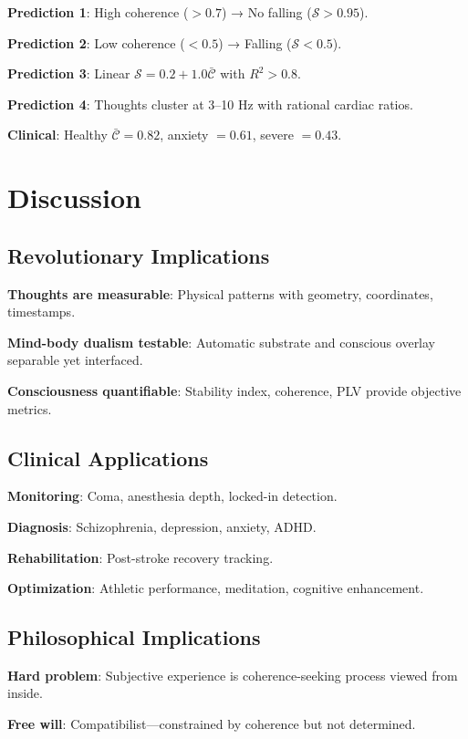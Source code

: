 \documentclass[12pt,twocolumn]{article}
\theoremstyle{remark}
\begin{document}
\textbf{Prediction 1}: High coherence ($> 0.7$) → No falling ($\mathcal{S} > 0.95$).

\textbf{Prediction 2}: Low coherence ($< 0.5$) → Falling ($\mathcal{S} < 0.5$).

\textbf{Prediction 3}: Linear $\mathcal{S} = 0.2 + 1.0 \bar{\mathcal{C}}$ with $R^2 > 0.8$.

\textbf{Prediction 4}: Thoughts cluster at 3--10 Hz with rational cardiac ratios.

\textbf{Clinical}: Healthy $\bar{\mathcal{C}} = 0.82$, anxiety $= 0.61$, severe $= 0.43$.

\section{Discussion}

\subsection{Revolutionary Implications}

\textbf{Thoughts are measurable}: Physical patterns with geometry, coordinates, timestamps.

\textbf{Mind-body dualism testable}: Automatic substrate and conscious overlay separable yet interfaced.

\textbf{Consciousness quantifiable}: Stability index, coherence, PLV provide objective metrics.

\subsection{Clinical Applications}

\textbf{Monitoring}: Coma, anesthesia depth, locked-in detection.

\textbf{Diagnosis}: Schizophrenia, depression, anxiety, ADHD.

\textbf{Rehabilitation}: Post-stroke recovery tracking.

\textbf{Optimization}: Athletic performance, meditation, cognitive enhancement.

\subsection{Philosophical Implications}

\textbf{Hard problem}: Subjective experience is coherence-seeking process viewed from inside.

\textbf{Free will}: Compatibilist---constrained by coherence but not determined.
\end{document}
